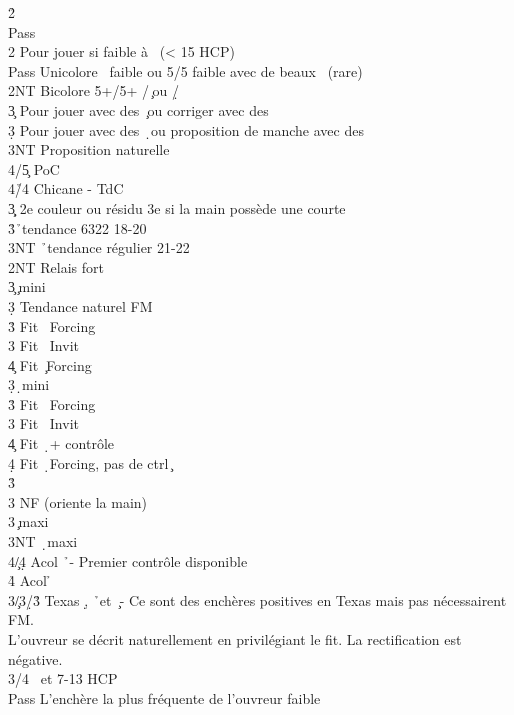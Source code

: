 \documentclass[a4paper]{article}
\begin{document}
\begin{bidtable}
2\h\+\\
Pass\\
2\s \> Pour jouer si faible à \s\ (< 15 HCP)\+\\
Pass \> Unicolore \s\ faible ou 5/5 faible avec de beaux \s\ (rare)\\
2NT \> Bicolore 5+/5+ \s /\c\ ou \s /\d \+\\
3\c \> Pour jouer avec des \c\ ou corriger avec des \d \\
3\d \> Pour jouer avec des \d\ ou proposition de manche avec des \c \\
3NT \> Proposition naturelle\\
4/5\c \> PoC\\
4\h/4\s \> Chicane - TdC\-\\
3\c\d\s \> 2e couleur ou résidu 3e si la main possède une courte\\
3\h {}\h\ tendance 6322 18-20\\
3NT \h\ tendance régulier 21-22\-\\
2NT \> Relais fort\+\\
3\c {}\c\ mini\+\\
3\d \> Tendance naturel FM\\
3\h \> Fit \s\ Forcing\\
3\s \> Fit \s\ Invit\\
4\c \> Fit \c\ Forcing\-\\
3\d {}\d\ mini\+\\
3\h \> Fit \s\ Forcing\\
3\s \> Fit \s\ Invit\\
4\c \> Fit \d\ + contrôle \c \\
4\d \> Fit \d\ Forcing, pas de ctrl \c \-\\
3\h {}\s \+\\
3\s \> NF (oriente la main)\-\\
3\s {}\c\ maxi\\
3NT \d\ maxi\\
4\c/4\d \> Acol \h\ - Premier contrôle disponible\\
4\h \> Acol \h \-\\
3\c/3\d/3\h \> Texas \d , \h\ et \c\ - Ce sont des enchères positives en Texas mais pas nécessairent FM.\\
\>L'ouvreur se décrit naturellement en privilégiant le fit. La rectification est négative.\\
3\s {}/4 \s\ et 7-13 HCP\+\\
Pass \> L'enchère la plus fréquente de l'ouvreur faible\\

\end{bidtable}
\end{document}
